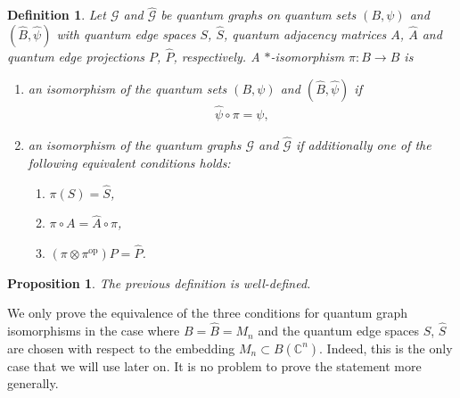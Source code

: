 \documentclass{amsart}
\newtheorem{definition}[thm]{Definition}
\newtheorem{proposition}[thm]{Proposition}
\newcommand{\C}{\mathbb{C}}
\begin{document}
\begin{definition}
    \label{pre::def:isomorphism_of_qgraphs}
    Let $\mathcal{G}$ and $\hat{\mathcal{G}}$ be quantum graphs on quantum sets $(B, \psi)$ and $(\hat{B}, \hat{\psi})$ with quantum edge spaces $S$, $\hat{S}$, quantum adjacency matrices $A$, $\hat{A}$ and quantum edge projections $P$, $\hat{P}$, respectively. A $\ast$-isomorphism $\pi: B \to \hat{B}$ is 
    \begin{enumerate}
        \item an \emph{isomorphism of the quantum sets $(B, \psi)$ and $(\hat{B}, \hat{\psi})$} if
        \begin{align*}
            \hat{\psi} \circ \pi = \psi,
        \end{align*}
        \item an \emph{isomorphism of the quantum graphs $\mathcal{G}$ and $\hat{\mathcal{G}}$} if additionally one of the following equivalent conditions holds:
        \begin{enumerate}
            \item $\pi(S) = \hat{S}$,
            \item $\pi \circ A = \hat{A} \circ \pi$,
            \item $(\pi \otimes \pi^\mathrm{op}) P = \hat{P}$.
        \end{enumerate}
    \end{enumerate}
\end{definition}


\begin{proposition}
    The previous definition is well-defined.
\end{proposition}


We only prove the equivalence of the three conditions for quantum graph isomorphisms in the case where $B = 
\hat{B} = M_n$ and the quantum edge spaces $S$, $\hat{S}$ are chosen with respect to the embedding $M_n \subset B(\C^n)$. Indeed, this is the only case that we will use later on. 
It is no problem to prove the statement more generally.
\end{document}
